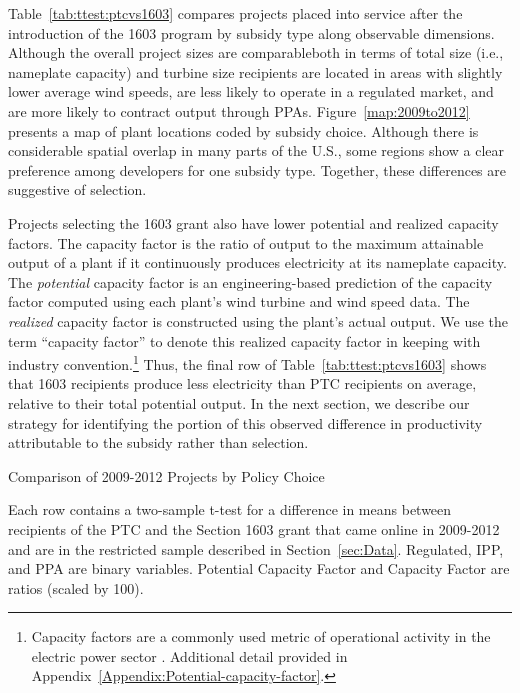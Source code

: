 \documentclass[12pt]{article}
\begin{document}
Table~\ref{tab:ttest:ptcvs1603} compares projects placed into service after the introduction of the 1603 program by subsidy type along observable dimensions. Although the overall project sizes are comparable\textemdash both in terms of total size (i.e., nameplate capacity) and turbine size recipients are located in areas with slightly lower average wind speeds, are less likely to operate in a regulated market, and are more likely to contract output through PPAs. Figure~\ref{map:2009to2012} presents a map of plant locations coded by subsidy choice. Although there is considerable spatial overlap in many parts of the U.S., some regions show a clear preference among developers for one subsidy type. Together, these differences are suggestive of selection.

Projects selecting the 1603 grant also have lower potential and realized capacity factors. The capacity factor is the ratio of output to the maximum attainable output of a plant if it continuously produces electricity at its nameplate capacity. The \textit{potential} capacity factor is an engineering-based prediction of the capacity factor computed using each plant's wind turbine and wind speed data. The \textit{realized} capacity factor is constructed using the plant's actual output. We use the term ``capacity factor'' to denote this realized capacity factor in keeping with industry convention.\footnote{Capacity factors are a commonly used metric of operational activity in the electric power sector \citep[see, for example,][]{davis_deregulation_2012}. Additional detail provided in Appendix~\ref{Appendix:Potential-capacity-factor}.} Thus, the final row of Table~\ref{tab:ttest:ptcvs1603} shows that 1603 recipients produce less electricity than PTC recipients on average, relative to their total potential output. In the next section, we describe our strategy for identifying the portion of this observed difference in productivity attributable to the subsidy rather than selection.

\begin{table}[h]
\caption{Comparison of 2009-2012 Projects by Policy Choice\label{tab:ttest:ptcvs1603}}

\footnotesize

Each row contains a two-sample t-test for a difference in means between recipients of the PTC and the Section 1603 grant that came online in 2009-2012 and are in the restricted sample described in Section~\ref{sec:Data}. Regulated, IPP, and PPA are binary variables. Potential Capacity Factor and Capacity Factor are ratios  (scaled by 100).
\end{table}
\end{document}
